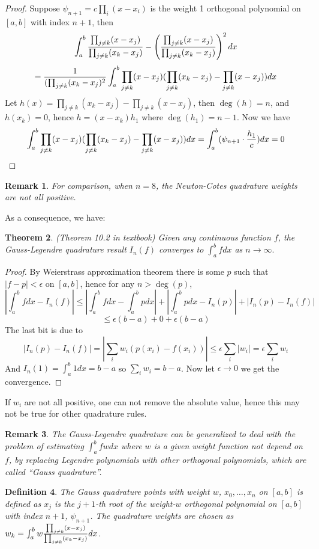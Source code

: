\documentclass{article} %
\theoremstyle{break}
\newtheorem{definition}{Definition}[section]
\newtheorem{thm}[definition]{Theorem}
\newtheorem{rem}[definition]{Remark}
\begin{document}
\begin{proof}
Suppose $\psi_{n+1}=c\prod_i(x-x_i)$ is the weight 1 orthogonal polynomial on $[a, b]$ with index $n+1$, then
\[\int_a^b{\prod_{j\not=k}(x-x_j)\over \prod_{j\not=k}(x_k-x_j)}-\left({\prod_{j\not=k}(x-x_j)\over \prod_{j\not=k}(x_k-x_j)}\right)^2dx\]
\[={1\over(\prod_{j\not=k}(x_k-x_j)^2}\int_a^b\prod_{j\not=k}(x-x_j)(\prod_{j\not=k}(x_k-x_j)-\prod_{j\not=k}(x-x_j))dx\]
Let $h(x)=\prod_{j\not=k}(x_k-x_j)-\prod_{j\not=k}(x-x_j)$, then $\deg(h)=n$, and $h(x_k)=0$, hence $h=(x-x_k)h_1$ where $\deg(h_1)=n-1$. Now we have
\[\int_a^b\prod_{j\not=k}(x-x_j)(\prod_{j\not=k}(x_k-x_j)-\prod_{j\not=k}(x-x_j))dx=\int_a^b(\psi_{n+1}\cdot{h_1\over c})dx=0\]
\end{proof}


\begin{rem} For comparison, when $n=8$, the Newton-Cotes quadrature weights are not all positive.\end{rem}

As a consequence, we have:
\begin{thm} (Theorem 10.2 in textbook) Given any continuous function $f$, the Gauss-Legendre quadrature result $I_n(f)$ converges to $\int_a^bfdx$ as $n\rightarrow\infty. $\end{thm}
\begin{proof}
  By Weierstrass approximation theorem there is some $p$ such that $|f-p|<\epsilon$ on $[a, b]$, hence for any $n>\deg(p)$,
  \[|\int_a^bfdx-I_n(f)|\leq |\int_a^bfdx-\int_a^bpdx|+|\int_a^bpdx-I_n(p)|+|I_n(p)-I_n(f)|\]
  \[\leq \epsilon(b-a)+0+\epsilon(b-a)\]
  The last bit is due to
  \[|I_n(p)-I_n(f)|=|\sum_iw_i(p(x_i)-f(x_i))|\leq \epsilon\sum_i|w_i|=\epsilon\sum_iw_i\]
  And $I_n(1)=\int_a^b1dx=b-a$ so $\sum_iw_i=b-a$.  Now let $\epsilon\rightarrow 0$ we get the convergence.
\end{proof}
If $w_i$ are not all positive, one can not remove the absolute value, hence this may not be true for other quadrature rules.


    \begin{rem} The Gauss-Legendre quadrature can be generalized to deal with the problem of estimating $\int_a^bfwdx$ where $w$ is a given weight function not depend on $f$, by replacing Legendre polynomials with other orthogonal polynomials, which are called ``Gauss quadrature''.
    \end{rem}

 \begin{definition}
  The Gauss quadrature points with weight $w$, $x_0,\dots, x_n$ on $[a, b]$ is defined as $x_j$ is the $j+1$-th root of the weight-$w$ orthogonal polynomial on $[a, b]$ with index $n+1$, $\psi_{n+1}$. The quadrature weights are chosen as $w_k=\int_a^bw{\prod_{j\not=k}(x-x_j)\over \prod_{j\not=k}(x_k-x_j)}dx$.
\end{definition}
\end{document}
